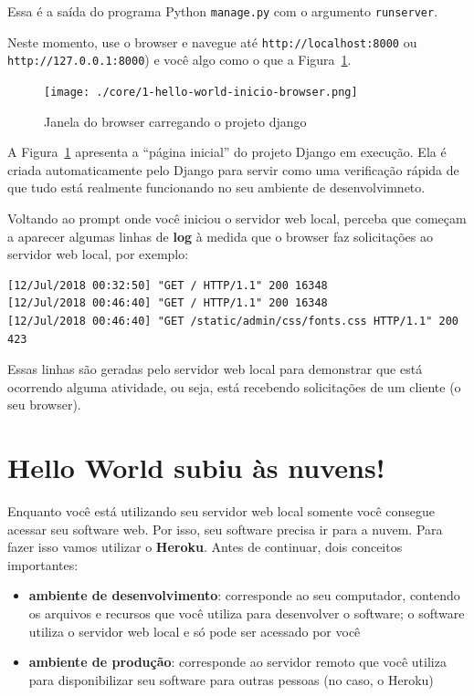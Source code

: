 \documentclass[brazil,a4paper,oneside,openright,parskip=full]{book}
\newcommand{\passthrough}[1]{#1}
\providecommand{\tightlist}{%
  \setlength{\itemsep}{0pt}\setlength{\parskip}{0pt}}
\begin{document}
Essa é a saída do programa Python \passthrough{\lstinline!manage.py!}
com o argumento \passthrough{\lstinline!runserver!}.

Neste momento, use o browser e navegue até
\passthrough{\lstinline!http://localhost:8000!} ou
\passthrough{\lstinline!http://127.0.0.1:8000!}) e você algo como o que
a Figura~\ref{fig:1-hello-world-inicio-browser}.

\begin{figure}
\hypertarget{fig:1-hello-world-inicio-browser}{%
\centering
\texttt{[image: ./core/1-hello-world-inicio-browser.png]}
\caption{Janela do browser carregando o projeto
django}\label{fig:1-hello-world-inicio-browser}
}
\end{figure}

A Figura~\ref{fig:1-hello-world-inicio-browser} apresenta a ``página
inicial'' do projeto Django em execução. Ela é criada automaticamente
pelo Django para servir como uma verificação rápida de que tudo está
realmente funcionando no seu ambiente de desenvolvimneto.

Voltando ao prompt onde você iniciou o servidor web local, perceba que
começam a aparecer algumas linhas de \textbf{log} à medida que o browser
faz solicitações ao servidor web local, por exemplo:

\begin{lstlisting}[style=nonumber]
[12/Jul/2018 00:32:50] "GET / HTTP/1.1" 200 16348
[12/Jul/2018 00:46:40] "GET / HTTP/1.1" 200 16348
[12/Jul/2018 00:46:40] "GET /static/admin/css/fonts.css HTTP/1.1" 200 423
\end{lstlisting}

Essas linhas são geradas pelo servidor web local para demonstrar que
está ocorrendo alguma atividade, ou seja, está recebendo solicitações de
um cliente (o seu browser).

\hypertarget{hello-world-subiu-uxe0s-nuvens}{%
\section{Hello World subiu às
nuvens!}\label{hello-world-subiu-uxe0s-nuvens}}

Enquanto você está utilizando seu servidor web local somente você
consegue acessar seu software web. Por isso, seu software precisa ir
para a nuvem. Para fazer isso vamos utilizar o \textbf{Heroku}. Antes de
continuar, dois conceitos importantes:

\begin{itemize}
\tightlist
\item
  \textbf{ambiente de desenvolvimento}: corresponde ao seu computador,
  contendo os arquivos e recursos que você utiliza para desenvolver o
  software; o software utiliza o servidor web local e só pode ser
  acessado por você
\item
  \textbf{ambiente de produção}: corresponde ao servidor remoto que você
  utiliza para disponibilizar seu software para outras pessoas (no caso,
  o Heroku)
\end{itemize}
\end{document}
